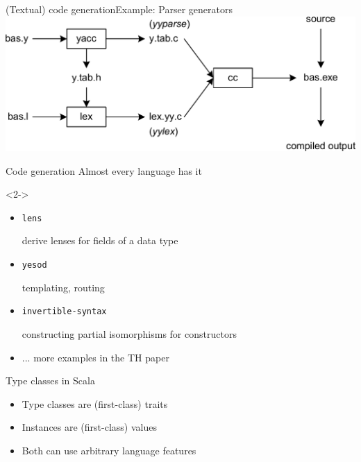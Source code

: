 \documentclass{beamer}
\begin{document}
\begin{frame}
\vskip40pt
\begin{center}
\end{center}
\end{frame}

\begin{frame}[fragile]{(Textual) code generation}{Example: Parser generators}
  \includegraphics[width=\linewidth]{img/yacc.png}
\end{frame}

\begin{frame}{Code generation}
  Almost every language has it

  \begin{visibleenv}<2->
    \begin{itemize}
      \item \texttt{lens}

         derive lenses for fields of a data type
      \item \texttt{yesod}

        templating, routing
      \item \texttt{invertible-syntax}

        constructing partial isomorphisms for constructors

      \item ... more examples in the TH paper
    \end{itemize}
  \end{visibleenv}
\end{frame}

\begin{frame}{Type classes in Scala}
  \begin{itemize}
    \item Type classes are (first-class) traits
    \item Instances are (first-class) values
    \item<visible@2> Both can use arbitrary language features
  \end{itemize}
\end{frame}
\end{document}
